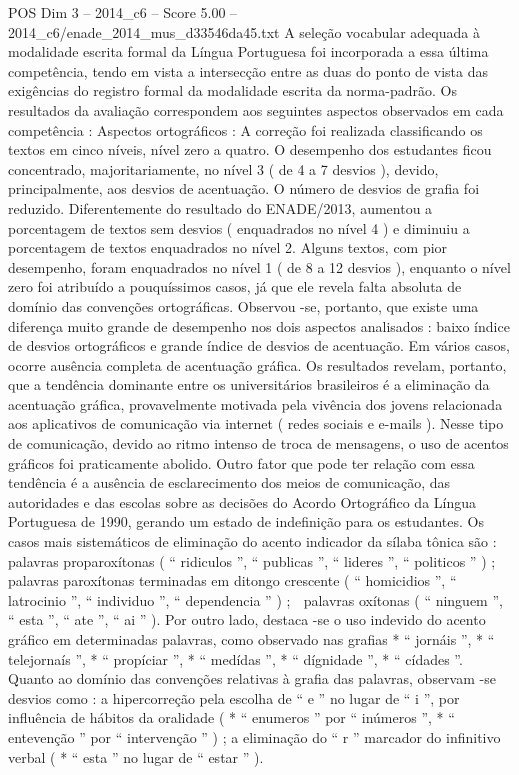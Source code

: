 \begin{textsample}{POS Dim 3 – 2014\_c6 – Score 5.00 – 2014\_c6/enade\_2014\_mus\_d33546da45.txt}
A seleção vocabular adequada à modalidade escrita formal da Língua Portuguesa foi incorporada a essa última competência, tendo em vista a intersecção entre as duas do ponto de vista das exigências do registro formal da modalidade escrita da norma-padrão.
Os resultados da avaliação correspondem aos seguintes aspectos observados em cada competência : Aspectos ortográficos : A correção foi realizada classificando os textos em cinco níveis, nível zero a quatro.
O desempenho dos estudantes ficou concentrado, majoritariamente, no nível 3 ( de 4 a 7 desvios ), devido, principalmente, aos desvios de acentuação.
O número de desvios de grafia foi reduzido.
Diferentemente do resultado do ENADE/2013, aumentou a porcentagem de textos sem desvios ( enquadrados no nível 4 ) e diminuiu a porcentagem de textos enquadrados no nível 2.
Alguns textos, com pior desempenho, foram enquadrados no nível 1 ( de 8 a 12 desvios ), enquanto o nível zero foi atribuído a pouquíssimos casos, já que ele revela falta absoluta de domínio das convenções ortográficas.
Observou -se, portanto, que existe uma diferença muito grande de desempenho nos dois aspectos analisados : baixo índice de desvios ortográficos e grande índice de desvios de acentuação.
Em vários casos, ocorre ausência completa de acentuação gráfica.
Os resultados revelam, portanto, que a tendência dominante entre os universitários brasileiros é a eliminação da acentuação gráfica, provavelmente motivada pela vivência dos jovens relacionada aos aplicativos de comunicação via internet ( redes sociais e e-mails ).
Nesse tipo de comunicação, devido ao ritmo intenso de troca de mensagens, o uso de acentos gráficos foi praticamente abolido.
Outro fator que pode ter relação com essa tendência é a ausência de esclarecimento dos meios de comunicação, das autoridades e das escolas sobre as decisões do Acordo Ortográfico da Língua Portuguesa de 1990, gerando um estado de indefinição para os estudantes.
Os casos mais sistemáticos de eliminação do acento indicador da sílaba tônica são :  palavras proparoxítonas ( “ ridiculos ”, “ publicas ”, “ lideres ”, “ politicos ” ) ;  palavras paroxítonas terminadas em ditongo crescente ( “ homicidios ”, “ latrocinio ”, “ individuo ”, “ dependencia ” ) ;  palavras oxítonas ( “ ninguem ”, “ esta ”, “ ate ”, “ ai ” ).
Por outro lado, destaca -se o uso indevido do acento gráfico em determinadas palavras, como observado nas grafias * “ jornáis ”, * “ telejornaís ”, * “ propíciar ”, * “ medídas ”, * “ dígnidade ”, * “ cídades ”.
Quanto ao domínio das convenções relativas à grafia das palavras, observam -se desvios como : a hipercorreção pela escolha de “ e ” no lugar de “ i ”, por influência de hábitos da oralidade ( * “ enumeros ” por “ inúmeros ”, * “ entevenção ” por “ intervenção ” ) ; a eliminação do “ r ” marcador do infinitivo verbal ( * “ esta ” no lugar de “ estar ” ).

\end{textsample}
